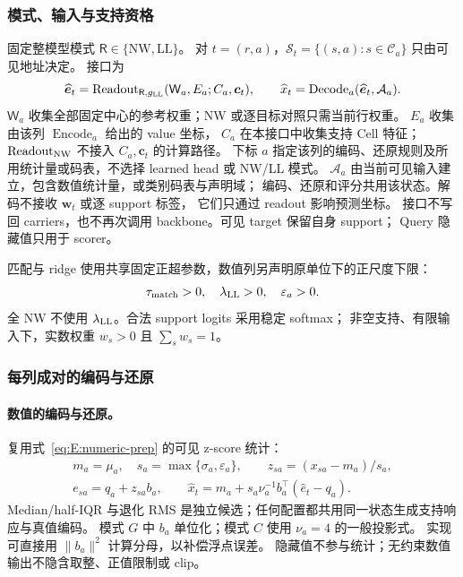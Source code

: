 \documentclass[11pt,UTF8,fontset=fandol]{ctexart}
\numberwithin{equation}{section}
\theoremstyle{definition}
\begin{document}
\subsubsection{模式、输入与支持资格}
固定整模型模式 $\mathsf R\in\{\mathrm{NW},\mathrm{LL}\}$。
对 $t=(r,a)$，$\mathcal S_t=\{(s,a):s\in\mathcal C_a\}$ 只由可见地址决定。
接口为
\begin{equation}
 \widehat{\bm e}_t=\operatorname{Readout}_{\mathsf R,g_{\rm LL}}
       (\mathsf W_a,E_a;C_a,\bm c_t),\qquad
 \widehat x_t=\operatorname{Decode}_a(\widehat{\bm e}_t,\mathcal A_a).
 \label{eq:R:terminal-interface}
\end{equation}
$\mathsf W_a$ 收集全部固定中心的参考权重；NW 或逐目标对照只需当前行权重。
$E_a$ 收集由该列 $\operatorname{Encode}_a$ 给出的 value 坐标，
$C_a$ 在本接口中收集支持 Cell 特征；
$\operatorname{Readout}_{\rm NW}$ 不接入 $C_a,\bm c_t$ 的计算路径。
下标 $a$ 指定该列的编码、还原规则及所用统计量或码表，不选择 learned head 或 NW/LL 模式。
$\mathcal A_a$ 由当前可见输入建立，包含数值统计量，或类别码表与声明域；
编码、还原和评分共用该状态。解码不接收 $\bm w_t$ 或逐 support 标签，
它们只通过 readout 影响预测坐标。
接口不写回 carriers，也不再次调用 backbone。可见 target 保留自身 support；
Query 隐藏值只用于 scorer。

匹配与 ridge 使用共享固定正超参数，数值列另声明原单位下的正尺度下限：
\begin{equation}
 \tau_{\rm match}>0,\quad\lambda_{\rm LL}>0,\quad\varepsilon_a>0.
 \label{eq:R:positive-parameters}
\end{equation}
全 NW 不使用 $\lambda_{\rm LL}$。合法 support logits 采用稳定 softmax；
非空支持、有限输入下，实数权重 $w_s>0$ 且 $\sum_s w_s=1$。

\subsubsection{每列成对的编码与还原}
\label{subsec:R:value-codec}


\paragraph{数值的编码与还原。}
复用式~\eqref{eq:E:numeric-prep} 的可见 z-score 统计：
\begin{equation}
 \begin{gathered}
 m_a=\mu_a,\quad s_a=\max\{\sigma_a,\varepsilon_a\},\qquad
 z_{sa}=(x_{sa}-m_a)/s_a,\\
 e_{sa}=q_a+z_{sa}b_a,\qquad
 \widehat x_t=m_a+s_a\nu_a^{-1}b_a^\top(\widehat e_t-q_a).
 \end{gathered}
 \label{eq:R:numeric-statistics}
\end{equation}
Median/half-IQR 与退化 RMS 是独立候选；任何配置都共用同一状态生成支持响应与真值编码。
模式 $G$ 中 $b_a$ 单位化；模式 $C$ 使用 $\nu_a=4$ 的一般投影式。
实现可直接用 $\|b_a\|^2$ 计算分母，以补偿浮点误差。
隐藏值不参与统计；无约束数值输出不隐含取整、正值限制或 clip。
\end{document}
